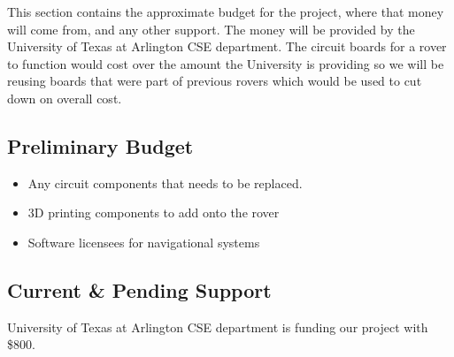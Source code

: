 This section contains the approximate budget for the project, where that money will come from, and any other support. The money will be provided by the University of Texas at Arlington CSE department. The circuit boards for a rover to function would cost over the amount the University is providing so we will be reusing boards that were part of previous rovers which would be used to cut down on overall cost. 

\subsection{Preliminary Budget}
\begin{itemize}
  \item Any circuit components that needs to be replaced.
  \item 3D printing components to add onto the rover
  \item Software licensees for navigational systems
\end{itemize}

\subsection{Current \& Pending Support}
University of Texas at Arlington CSE department is funding our project with \$800. 
